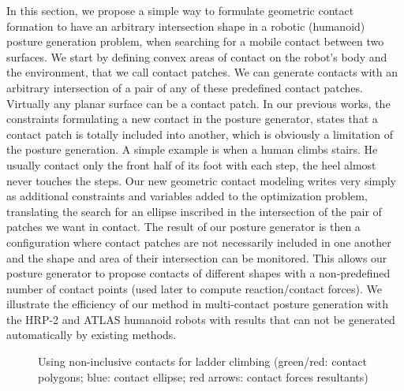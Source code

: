 In this section, we propose a simple way to formulate geometric contact formation to have an arbitrary intersection shape in a robotic (humanoid) posture generation problem, when searching for a mobile contact between two surfaces.
We start by defining convex areas of contact on the robot's body and the environment, that we call contact patches.
We can generate contacts with an arbitrary intersection of a pair of any of these predefined contact patches.
Virtually any planar surface can be a contact patch.
In our previous works, the constraints formulating a new contact in the posture generator, states that a contact patch is totally included into another, which is obviously a limitation of the posture generation.
A simple example is when a human climbs stairs. He usually contact only the front half of its foot with each step, the heel almost never touches the steps.
Our new geometric contact modeling writes very simply as additional constraints and variables added to the optimization problem, translating the search for an ellipse inscribed in the intersection of the pair of patches we want in contact.
The result of our posture generator is then a configuration where contact patches are not necessarily included in one another and the shape and area of their intersection can be monitored.
This allows our posture generator to propose contacts of different shapes with a non-predefined number of contact points (used later to compute reaction/contact forces).
We illustrate the efficiency of our method in multi-contact posture generation with the HRP-2 and ATLAS humanoid robots with results that can not be generated automatically by existing methods.

\begin{figure}
\centering
  \centering
  \setlength\fboxsep{0pt}
  \setlength\fboxrule{1pt}
\caption{Using non-inclusive contacts for ladder climbing (green/red: contact polygons; blue: contact ellipse; red arrows: contact forces resultants)}
\label{fig:hrp2_jrl_complete}
\end{figure}

